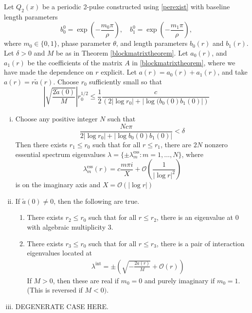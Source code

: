 \documentclass[thesis.tex]{subfiles}
\begin{document}
\begin{theorem}\label{theorem:2peigscase1}
Let $Q_2(x)$ be a periodic 2-pulse constructed using \cref{perexist} with baseline length parameters
\[
b_0^0 = \exp\left(-\frac{m_0 \pi}{\rho}\right), \quad b_1^0 = \exp\left(-\frac{m_1 \pi}{\rho}\right),
\] 
where $m_0 \in \{ 0, 1\}$, phase parameter $\theta$, and length parameters $b_0(r)$ and $b_1(r)$. Let $\delta > 0$ and $M$ be as in Theorem \ref{blockmatrixtheorem}. Let $a_0(r)$, and $a_1(r)$ be the coefficients of the matrix $A$ in \ref{blockmatrixtheorem}, where we have made the dependence on $r$ explicit. Let $a(r) = a_0(r) + a_1(r)$, and take $a(r) = r \tilde{a}(r)$. Choose $r_0$ sufficiently small so that 
\begin{equation}\label{nobubblecond}
\left| \sqrt{\frac{2 \tilde{a}(0)}{M}}\right|r_0^{1/2} \leq \frac{1}{2} \frac{c}{\left( 2 |\log r_0| + |\log( b_0(0) b_1(0) |\right)}
\end{equation}

\begin{enumerate}[(i)]
\item Choose any positive integer $N$ such that
\[
\frac{N c \pi}{2 |\log r_0| + |\log b_0(0) b_1(0)| } < \delta
\]
Then there exists $r_1 \leq r_0$ such that for all $r\leq r_1$, there are $2N$ nonzero essential spectrum eigenvalues $\lambda = \{ \pm \lambda_m^{\text{ess}} : m = 1, \dots, N\}$, where
\[
\lambda_m^{\text{ess}}(r) = c \frac{m \pi i}{X}+  \mathcal{O}\left( \frac{1}{|\log r|^2} \right)
\]
is on the imaginary axis and $X = \mathcal{O}(|\log r|)$

\item If $\tilde{a}(0) \neq 0$, then the following are true.
\begin{enumerate}
	\item There exists $r_2 \leq r_0$ such that for all $r \leq r_2$, there is an eigenvalue at 0 with algebraic multiplicity 3.

	\item There exists $r_3 \leq r_0$ such that for all $r \leq r_3$, there is a pair of interaction eigenvalues located at
	\begin{align*}
	\lambda^{\text{int}} = \pm \left( \sqrt{-\frac{2 a(r)}{M}} + \mathcal{O}( r ) \right)
	\end{align*}
	If $M > 0$, then these are real if $m_0 = 0$ and purely imaginary if $m_0 = 1$. (This is reversed if $M < 0)$. 
\end{enumerate}
\item DEGENERATE CASE HERE.

\end{enumerate}
\end{theorem}
\end{document}
